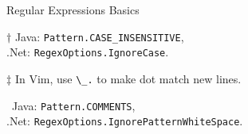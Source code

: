 \documentclass[10pt, a4paper, landscape]{scrartcl}
\newcommand{\regex}[1]{\texttt{#1}}
\newcommand{\cregex}[1]{\colorbox{gray!30}{\regex{#1}}}
\newcommand{\code}[1]{\texttt{#1}}
\newcommand{\bs}{\textbackslash}
\newcommand{\dnet}{{.}Net}
\begin{document}
\begin{cheatsheet}{Regular Expressions Basics}
\begin{col3}

\begin{cheatnote}
$\dagger$ Java: \code{Pattern.CASE\_INSENSITIVE},\\
\dnet: \code{RegexOptions.IgnoreCase}.
\end{cheatnote}
$\ddagger$ In Vim, use \cregex{\bs\_.} to make dot match new lines.\\
\begin{cheatnote}
\textsection\ Java: \code{Pattern.COMMENTS},\\
\dnet: \code{RegexOptions.IgnorePatternWhiteSpace}.
\end{cheatnote}

\end{col3}
\end{cheatsheet}

\newpage
\end{document}
